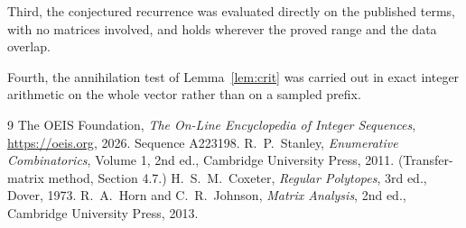 \documentclass[11pt,a4paper]{article}
\theoremstyle{plain}
\theoremstyle{definition}
\begin{document}
Third, the conjectured recurrence was evaluated directly on the published terms, with no
matrices involved, and holds wherever the proved range and the data overlap.

Fourth, the annihilation test of Lemma~\ref{lem:crit} was carried out in exact integer
arithmetic on the whole vector rather than on a sampled prefix.

\begin{thebibliography}{9}
 The OEIS Foundation, \emph{The On-Line Encyclopedia of Integer
Sequences}, \url{https://oeis.org}, 2026. Sequence A223198.
 R.~P.~Stanley, \emph{Enumerative Combinatorics}, Volume 1, 2nd ed.,
Cambridge University Press, 2011. (Transfer-matrix method, Section 4.7.)
 H.~S.~M.~Coxeter, \emph{Regular Polytopes}, 3rd ed., Dover, 1973.
 R.~A.~Horn and C.~R.~Johnson, \emph{Matrix Analysis}, 2nd ed., Cambridge
University Press, 2013.
\end{thebibliography}
\end{document}
